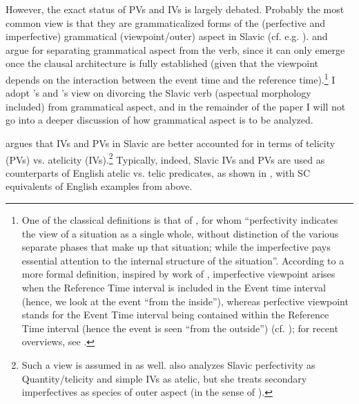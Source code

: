\documentclass[output=paper,colorlinks,citecolor=brown]{langscibook}
\begin{document}
\noindent However, the exact status of PVs and IVs is largely debated. Probably the most common view is that they are grammaticalized forms of the (perfective and imperfective) grammatical (viewpoint/outer) aspect in Slavic (cf. e.g. \citealt{Pereltsvaig2005, Borik_2006, Ramchand2008, Rothstein2016, Minor2022}). \citet{Łazorczyk2010} and \citet{Tatevosov2011, Tatevosov2015Slavic} argue for separating grammatical aspect from the verb, since it can only emerge once the clausal architecture is fully established (given that the viewpoint depends on the interaction between the event time and the reference time).\footnote{One of the classical definitions is that of \citet[16]{Comrie1976}, for whom ``perfectivity indicates the view of a situation as a single whole, without distinction of the various separate phases that make up that situation; while the imperfective pays essential attention to the internal structure of the situation''. According to a more formal definition, inspired by work of \citet{Reichenbach1947}, imperfective viewpoint arises when the Reference Time interval is included in the Event time interval (hence, we look at the event ``from the inside''), whereas perfective viewpoint stands for the Event Time interval being contained within the Reference Time interval (hence the event is seen ``from the outside'') (cf. \citealt{Klein1994, Bhatt_Pancheva2005, Łazorczyk2010}); for recent overviews, see \citet{Arche2014a, Arche2014b, Rothstein2016}.} I adopt \citeauthor{Łazorczyk2010}'s and \citeauthor{Tatevosov2011}'s view on divorcing the Slavic verb (aspectual morphology included) from grammatical aspect, and in the remainder of the paper I will not go into a deeper discussion of how grammatical aspect is to be analyzed.

\citet{Łazorczyk2010} argues that IVs and PVs in Slavic are better accounted for in terms of telicity (PVs) vs. atelicity (IVs).\footnote{Such a view is assumed in \citet{MacDonald_2008} as well. \citet[]{Borer_2005} also analyzes Slavic perfectivity as Quantity/telicity and simple IVs as atelic, but she treats secondary imperfectives as species of outer aspect (in the sense of \citealt[]{Verkuyl_1972}).} Typically, indeed, Slavic IVs and PVs are used as counterparts of English atelic vs. telic predicates, as shown in , with SC equivalents of English examples from  above.\largerpage

\ea \label{mil:ex:SCcounterparts}
\z
\z
\end{document}
